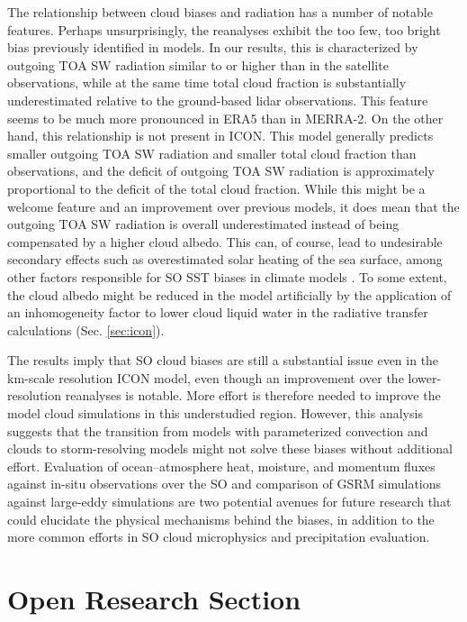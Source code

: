 \documentclass[draft]{agujournal2019}
\begin{document}
The relationship between cloud biases and radiation has a number of notable features. Perhaps unsurprisingly, the reanalyses exhibit the too few, too bright bias previously identified in models. In our results, this is characterized by outgoing TOA SW radiation similar to or higher than in the satellite observations, while at the same time total cloud fraction is substantially underestimated relative to the ground-based lidar observations. This feature seems to be much more pronounced in ERA5 than in MERRA-2. On the other hand, this relationship is not present in ICON. This model generally predicts smaller outgoing TOA SW radiation and smaller total cloud fraction than observations, and the deficit of outgoing TOA SW radiation is approximately proportional to the deficit of the total cloud fraction. While this might be a welcome feature and an improvement over previous models, it does mean that the outgoing TOA SW radiation is overall underestimated instead of being compensated by a higher cloud albedo. This can, of course, lead to undesirable secondary effects such as overestimated solar heating of the sea surface, among other factors responsible for SO SST biases in climate models \cite{zhang2023,luo2023,hyder2018}. To some extent, the cloud albedo might be reduced in the model artificially by the application of an inhomogeneity factor to lower cloud liquid water in the radiative transfer calculations (Sec. \ref{sec:icon}).

The results imply that SO cloud biases are still a substantial issue even in the km-scale resolution ICON model, even though an improvement over the lower-resolution reanalyses is notable. More effort is therefore needed to improve the model cloud simulations in this understudied region. However, this analysis suggests that the transition from models with parameterized convection and clouds to storm-resolving models might not solve these biases without additional effort. Evaluation of ocean--atmosphere heat, moisture, and momentum fluxes against in-situ observations over the SO and comparison of GSRM simulations against large-eddy simulations are two potential avenues for future research that could elucidate the physical mechanisms behind the biases, in addition to the more common efforts in SO cloud microphysics and precipitation evaluation.

\section*{Open Research Section}
\end{document}
